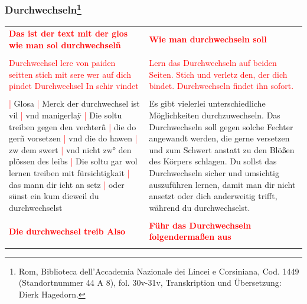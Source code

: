 \null
\thispagestyle{empty}

\newpage

\subsubsection[Durchwechseln]{
    Durchwechseln\footnote{
        \hspace*{0.5ex}Rom, Biblioteca dell'Accademia Nazionale dei Lincei e Corsiniana,
        Cod. 1449 (Standortnummer 44 A 8), fol. 30v-31v, Transkription und Übersetzung: Dierk Hagedorn.}}

\begin{longtable}{p{6.25cm}p{6.25cm}}
    \textbf{\textcolor{red}{
        Das ist der text mit der glos wie man sol durchwechselñ}}
    &
    \textbf{\textcolor{red}{
        Wie man durchwechseln soll}}
    \\
    \\
    \textcolor{red}{
        Durchwechsel lere von paiden seitten
        stich mit sere wer auf dich pindet
        Durchwechsel In schir vindet}
    &
    \textcolor{red}{
        Lern das Durchwechseln auf beiden Seiten.
        Stich und verletz den, der dich bindet.
        Durchwechseln findet ihn sofort.}
    \\
    \\
    \textcolor{red}{|} Glosa
    \textcolor{red}{|} Merck der durchwechsel ist vil
    \textcolor{red}{|} vnd manigerlaÿ
    \textcolor{red}{|} Die soltu treiben gegen den vechterñ
    \textcolor{red}{|} die do gerñ vorsetzen
    \textcolor{red}{|} vnd die do hawen
    \textcolor{red}{|} zw dem swert
    \textcolor{red}{|} vnd nicht zw° den plössen des leibs
    \textcolor{red}{|} Die soltu gar wol lernen treiben mit fürsichtigkait
    \textcolor{red}{|} das mann dir icht an setz
    \textcolor{red}{|} oder sünst ein kum dieweil du durchwechselst
    &
    Es gibt vielerlei unterschiedliche Möglichkeiten durchzuwechseln.
    Das Durchwechseln soll gegen solche Fechter angewandt werden, die gerne versetzen und zum Schwert anstatt zu den Blößen des Körpers schlagen.
    Du sollst das Durchwechseln sicher und umsichtig auszuführen lernen, damit man dir nicht ansetzt oder dich anderweitig trifft, während du durchwechselst.
    \\
    \\
    \textbf{\textcolor{red}{
        Die durchwechsel treib Also}}
    &
    \textbf{\textcolor{red}{
        Führ das Durchwechseln folgendermaßen aus}}
    \\
    \\

\end{longtable}
